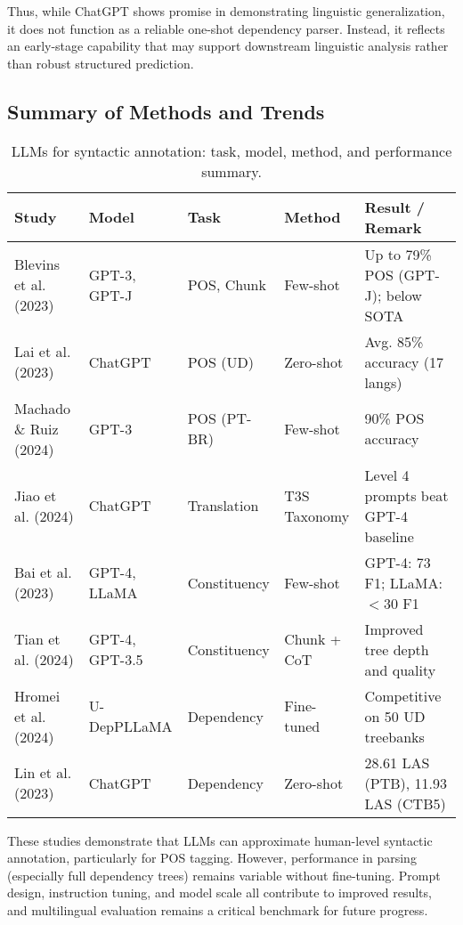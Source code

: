 Thus, while ChatGPT shows promise in demonstrating linguistic generalization, it does not function as a reliable one-shot dependency parser. Instead, it reflects an early-stage capability that may support downstream linguistic analysis rather than robust structured prediction.

\subsection{Summary of Methods and Trends}

\begin{table}[ht]
\centering
\begin{tabular}{p{3.3cm} p{2cm} p{2cm} p{2.5cm} p{3.5cm}}
\toprule
\textbf{Study} & \textbf{Model} & \textbf{Task} & \textbf{Method} & \textbf{Result / Remark} \\
\midrule
Blevins et al. (2023) & GPT-3, GPT-J & POS, Chunk & Few-shot & Up to 79\% POS (GPT-J); below SOTA \\
Lai et al. (2023) & ChatGPT & POS (UD) & Zero-shot & Avg. 85\% accuracy (17 langs) \\
Machado \& Ruiz (2024) & GPT-3 & POS (PT-BR) & Few-shot & 90\% POS accuracy \\
Jiao et al. (2024) & ChatGPT & Translation & T3S Taxonomy & Level 4 prompts beat GPT-4 baseline \\
Bai et al. (2023) & GPT-4, LLaMA & Constituency & Few-shot & GPT-4: 73 F1; LLaMA: $<$30 F1 \\
Tian et al. (2024) & GPT-4, GPT-3.5 & Constituency & Chunk + CoT & Improved tree depth and quality \\
Hromei et al. (2024) & U-DepPLLaMA & Dependency & Fine-tuned & Competitive on 50 UD treebanks \\
Lin et al. (2023) & ChatGPT & Dependency & Zero-shot & 28.61 LAS (PTB), 11.93 LAS (CTB5) \\
\bottomrule
\end{tabular}
\caption{LLMs for syntactic annotation: task, model, method, and performance summary.}
\label{tab:llm_syntax}
\end{table}

These studies demonstrate that LLMs can approximate human-level syntactic annotation, particularly for POS tagging. However, performance in parsing (especially full dependency trees) remains variable without fine-tuning. Prompt design, instruction tuning, and model scale all contribute to improved results, and multilingual evaluation remains a critical benchmark for future progress.


